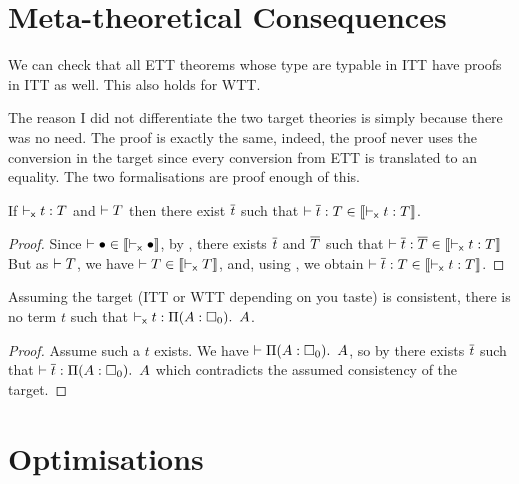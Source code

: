 \section{Meta-theoretical Consequences}

We can check that all \acrshort{ETT} theorems whose type are typable in
\acrshort{ITT} have proofs in \acrshort{ITT} as well.
This also holds for \acrshort{WTT}.

The reason I did not differentiate the two target theories is simply because
there was no need. The proof is exactly the same, indeed, the proof never uses
the conversion in the target since every conversion from \acrshort{ETT} is
translated to an equality.
The two formalisations are proof enough of this.

\begin{corollary}[Conservativity]
  If $\vdash_{\mathsf{x}} t : T$ and $\vdash T$ then there exist $\overline{t}$ such that
    $\vdash \overline{t} : T \in \llbracket \vdash_{\mathsf{x}} t : T \rrbracket$.
\end{corollary}

\begin{proof}
  Since $\vdash \bullet \in \llbracket \vdash_{\mathsf{x}} \bullet \rrbracket$, by
  , there exists $\overline{t}$ and $\overline{T}$ such that
  $\vdash \overline{t} : \overline{T} \in \llbracket \vdash_{\mathsf{x}} t : T \rrbracket$
  But as $\vdash T$, we have
  $\vdash T \in \llbracket \vdash_{\mathsf{x}} T \rrbracket$, and,
  using , we obtain
  $\vdash \overline{t} : T \in \llbracket \vdash_{\mathsf{x}} t : T \rrbracket$.
\end{proof}

\begin{corollary}
  Assuming the target (\acrshort{ITT} or \acrshort{WTT} depending on you taste)
  is consistent, there is no term $t$ such that
  $\vdash_{\mathsf{x}} t : \mathop{\Pi(A:\square_{0}).\ }{A}$.
\end{corollary}

\begin{proof}
  Assume such a $t$ exists.
  We have $\vdash \mathop{\Pi(A:\square_{0}).\ }{A}$, so by 
  there exists $\overline{t}$ such that $\vdash \overline{t} : \mathop{\Pi(A:\square_{0}).\ }{A}$ which
  contradicts the assumed consistency of the target.
\end{proof}

\section{Optimisations}


